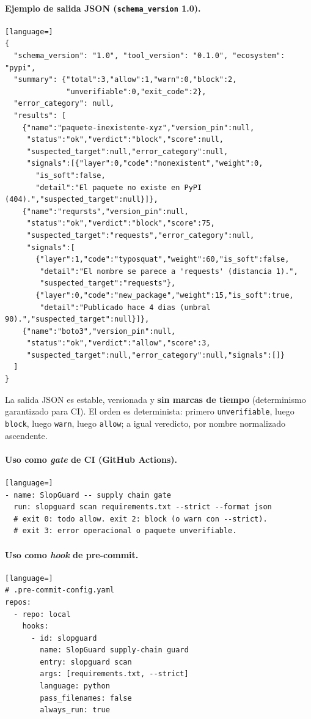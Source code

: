 \documentclass[11pt,a4paper]{article}
\begin{document}
\paragraph{Ejemplo de salida JSON (\texttt{schema\_version} 1.0).}
\begin{lstlisting}[language=]
{
  "schema_version": "1.0", "tool_version": "0.1.0", "ecosystem": "pypi",
  "summary": {"total":3,"allow":1,"warn":0,"block":2,
              "unverifiable":0,"exit_code":2},
  "error_category": null,
  "results": [
    {"name":"paquete-inexistente-xyz","version_pin":null,
     "status":"ok","verdict":"block","score":null,
     "suspected_target":null,"error_category":null,
     "signals":[{"layer":0,"code":"nonexistent","weight":0,
       "is_soft":false,
       "detail":"El paquete no existe en PyPI (404).","suspected_target":null}]},
    {"name":"reqursts","version_pin":null,
     "status":"ok","verdict":"block","score":75,
     "suspected_target":"requests","error_category":null,
     "signals":[
       {"layer":1,"code":"typosquat","weight":60,"is_soft":false,
        "detail":"El nombre se parece a 'requests' (distancia 1).",
        "suspected_target":"requests"},
       {"layer":0,"code":"new_package","weight":15,"is_soft":true,
        "detail":"Publicado hace 4 dias (umbral 90).","suspected_target":null}]},
    {"name":"boto3","version_pin":null,
     "status":"ok","verdict":"allow","score":3,
     "suspected_target":null,"error_category":null,"signals":[]}
  ]
}
\end{lstlisting}

La salida JSON es estable, versionada y \textbf{sin marcas de tiempo} (determinismo
garantizado para CI). El orden es determinista: primero \texttt{unverifiable}, luego
\texttt{block}, luego \texttt{warn}, luego \texttt{allow}; a igual veredicto,
por nombre normalizado ascendente.

\paragraph{Uso como \emph{gate} de CI (GitHub Actions).}
\begin{lstlisting}[language=]
- name: SlopGuard -- supply chain gate
  run: slopguard scan requirements.txt --strict --format json
  # exit 0: todo allow. exit 2: block (o warn con --strict).
  # exit 3: error operacional o paquete unverifiable.
\end{lstlisting}

\paragraph{Uso como \emph{hook} de pre-commit.}
\begin{lstlisting}[language=]
# .pre-commit-config.yaml
repos:
  - repo: local
    hooks:
      - id: slopguard
        name: SlopGuard supply-chain guard
        entry: slopguard scan
        args: [requirements.txt, --strict]
        language: python
        pass_filenames: false
        always_run: true
\end{lstlisting}
\end{document}
